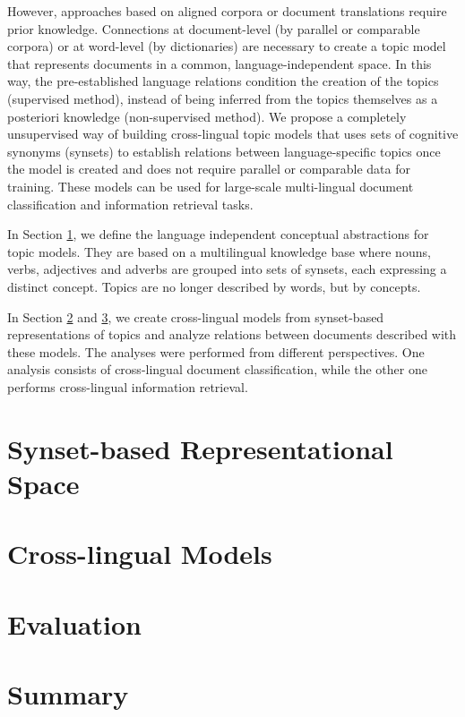 However, approaches based on aligned corpora or document translations require prior knowledge. Connections at document-level (by parallel or comparable corpora) or at word-level (by dictionaries) are necessary to create a topic model that represents documents in a common, language-independent space. In this way, the pre-established language relations condition the creation of the topics (supervised method), instead of being inferred from the topics themselves as a posteriori knowledge (non-supervised method). We propose a completely unsupervised way of building cross-lingual topic models that uses sets of cognitive synonyms (synsets) to establish relations between language-specific topics once the model is created and does not require parallel or comparable data for training. These models can be used for large-scale multi-lingual document classification and information retrieval tasks.

In Section \ref{sec:synset-space}, we define the language independent conceptual abstractions for topic models. They are based on a multilingual knowledge base where nouns, verbs, adjectives and adverbs are grouped into sets of synsets, each expressing a distinct concept. Topics are no longer described by words, but by concepts.

In Section \ref{sec:crosslingual-models} and \ref{sec:crosslingual-evaluation}, we create cross-lingual models from synset-based representations of topics and analyze relations between documents described with these models. The analyses were performed from different perspectives. One analysis consists of cross-lingual document classification, while the other one performs cross-lingual information retrieval.

\section{Synset-based Representational Space}
\label{sec:synset-space}

\section{Cross-lingual Models}
\label{sec:crosslingual-models}

\section{Evaluation}
\label{sec:crosslingual-evaluation}

\section{Summary}
\label{sec:crosslingual-summary}


